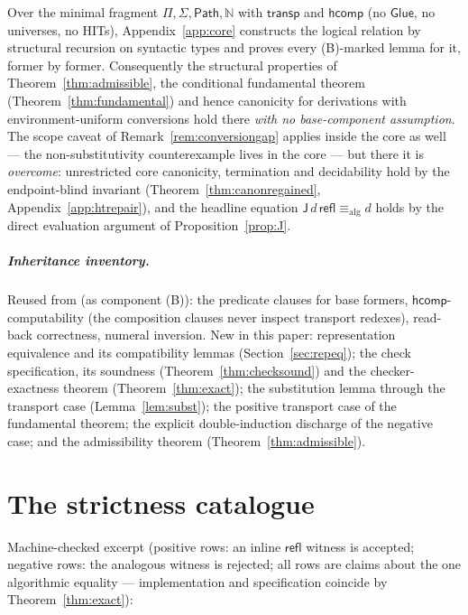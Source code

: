 \documentclass{lmcs}
\newcommand{\transp}{\mathsf{transp}}
\newcommand{\hcomp}{\mathsf{hcomp}}
\newcommand{\refl}{\mathsf{refl}}
\newcommand{\J}{\mathsf{J}}
\newcommand{\Glue}{\mathsf{Glue}}
\newcommand{\aconv}{\equiv_{\mathrm{alg}}}
\newcommand{\Path}{\mathsf{Path}}
\begin{document}
\begin{cor}\label{thm:core}
  Over the minimal fragment $\Pi, \Sigma, \Path, \mathbb{N}$ with
  $\transp$ and $\hcomp$ (no $\Glue$, no universes, no HITs),
  Appendix~\ref{app:core} constructs the logical relation by
  structural recursion on syntactic types and proves every
  (B)-marked lemma for it, former by former.  Consequently the
  structural properties of Theorem~\ref{thm:admissible}, the
  conditional fundamental theorem
  (Theorem~\ref{thm:fundamental}) and hence canonicity for
  derivations with environment-uniform conversions hold there
  \emph{with no base-component assumption}.  The scope caveat of
  Remark~\ref{rem:conversiongap} applies inside the core as well ---
  the non-substitutivity counterexample lives in the core --- but
  there it is \emph{overcome}: unrestricted core canonicity,
  termination and decidability hold by the endpoint-blind invariant
  (Theorem~\ref{thm:canonregained},
  Appendix~\ref{app:htrepair}), and the headline equation
  $\J\,d\,\refl \aconv d$ holds by the direct evaluation argument of
  Proposition~\ref{prop:J}.
\end{cor}

\subparagraph*{Inheritance inventory.}  Reused from
\cite{HuberNorm} (as component (B)): the predicate clauses for base
formers, $\hcomp$-computability (the composition clauses never
inspect transport redexes), read-back correctness, numeral
inversion.  New in this paper: representation equivalence and its
compatibility lemmas (Section~\ref{sec:repeq}); the check
specification, its soundness (Theorem~\ref{thm:checksound}) and the
checker-exactness theorem (Theorem~\ref{thm:exact}); the
substitution lemma through the transport case
(Lemma~\ref{lem:subst}); the positive transport case of the
fundamental theorem; the explicit double-induction discharge of the
negative case; and the admissibility theorem
(Theorem~\ref{thm:admissible}).

\section{The strictness catalogue}
\label{sec:catalogue}

Machine-checked excerpt (positive rows: an inline $\refl$ witness is
accepted; negative rows: the analogous witness is rejected; all rows
are claims about the one algorithmic equality --- implementation and
specification coincide by Theorem~\ref{thm:exact}):
\end{document}
